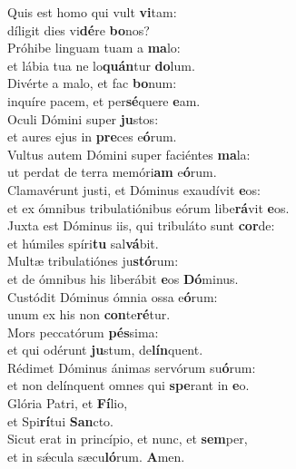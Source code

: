 \evenverse Quis est homo qui vult \textbf{vi}tam:~\*\\
\evenverse díligit dies vi\textbf{dé}re \textbf{bo}nos?\\
\oddverse Próhibe linguam tuam a \textbf{ma}lo:~\*\\
\oddverse et lábia tua ne lo\textbf{quán}tur \textbf{do}lum.\\
\evenverse Divérte a malo, et fac \textbf{bo}num:~\*\\
\evenverse inquíre pacem, et per\textbf{sé}quere \textbf{e}am.\\
\oddverse Oculi Dómini super \textbf{ju}stos:~\*\\
\oddverse et aures ejus in \textbf{pre}ces e\textbf{ó}rum.\\
\evenverse Vultus autem Dómini super faciéntes \textbf{ma}la:~\*\\
\evenverse ut perdat de terra memóri\textbf{am} e\textbf{ó}rum.\\
\oddverse Clamavérunt justi, et Dóminus exaudívit \textbf{e}os:~\*\\
\oddverse et ex ómnibus tribulatiónibus eórum libe\textbf{rá}vit \textbf{e}os.\\
\evenverse Juxta est Dóminus iis, qui tribuláto sunt \textbf{cor}de:~\*\\
\evenverse et húmiles spíri\textbf{tu} sal\textbf{vá}bit.\\
\oddverse Multæ tribulatiónes ju\textbf{stó}rum:~\*\\
\oddverse et de ómnibus his liberábit \textbf{e}os \textbf{Dó}minus.\\
\evenverse Custódit Dóminus ómnia ossa e\textbf{ó}rum:~\*\\
\evenverse unum ex his non \textbf{con}te\textbf{ré}tur.\\
\oddverse Mors peccatórum \textbf{pés}sima:~\*\\
\oddverse et qui odérunt \textbf{ju}stum, de\textbf{lín}quent.\\
\evenverse Rédimet Dóminus ánimas servórum su\textbf{ó}rum:~\*\\
\evenverse et non delínquent omnes qui \textbf{spe}rant in \textbf{e}o.\\
\oddverse Glória Patri, et \textbf{Fí}lio,~\*\\
\oddverse et Spi\textbf{rí}tui \textbf{San}cto.\\
\evenverse Sicut erat in princípio, et nunc, et \textbf{sem}per,~\*\\
\evenverse et in sǽcula sæcu\textbf{ló}rum. \textbf{A}men.\\
